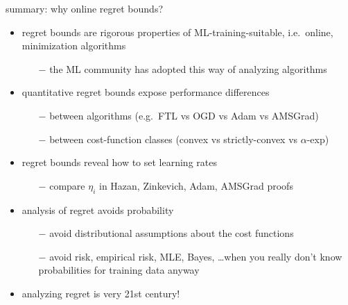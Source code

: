 \documentclass[xcolor={svgnames},
               hyperref={colorlinks,citecolor=DeepPink4,linkcolor=FireBrick,urlcolor=Maroon},
               usepdftitle=false]  %
               {beamer}
\begin{document}
\begin{frame}{\alert{summary}: why online regret bounds?}

\begin{itemize}
\item regret bounds are rigorous properties of ML-training-suitable, i.e.~online, minimization algorithms
    \begin{itemize}
    \item[$-$] the ML community has adopted this way of analyzing algorithms
    \end{itemize}
\item quantitative regret bounds expose performance differences
    \begin{itemize}
    \item[$-$] between algorithms (e.g.~FTL vs OGD vs Adam vs AMSGrad)
    \item[$-$] between cost-function classes (convex vs strictly-convex vs $\alpha$-exp)
    \end{itemize}
\item regret bounds reveal how to set learning rates
    \begin{itemize}
    \item[$-$] compare $\eta_i$ in Hazan, Zinkevich, Adam, AMSGrad proofs    \end{itemize}
\item analysis of regret avoids probability
    \begin{itemize}
    \item[$-$] avoid distributional assumptions about the cost functions
    \item[$-$] avoid risk, empirical risk, MLE, Bayes, \dots when you really don't know probabilities for training data anyway
    \end{itemize}
\item analyzing regret is very 21st century!
\end{itemize}
\end{frame}
\end{document}
